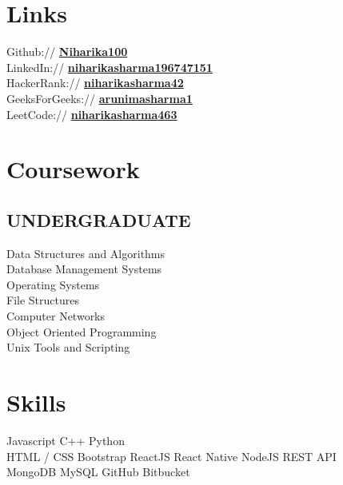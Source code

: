 \documentclass[]{deedy-resume-openfont}
\begin{document}
\begin{minipage}[t]{0.33\textwidth}

\section{Links} 
Github:// \href{https://github.com/Niharika100}{\bf Niharika100} \\
LinkedIn:// \href{https://www.linkedin.com/in/niharikasharma196747151/}{\bf niharikasharma196747151} \\
HackerRank:// \href{https://www.hackerrank.com/niharikasharma42}{\bf niharikasharma42} \\
GeeksForGeeks:// \href{https://auth.geeksforgeeks.org/user/arunimasharma1/profile}{\bf arunimasharma1} \\
LeetCode:// \href{https://leetcode.com/niharikasharma463/}{\bf niharikasharma463}


\sectionsep
\section{Coursework}
\subsection{UNDERGRADUATE}
Data Structures and Algorithms\\
Database Management Systems\\
Operating Systems\\
File Structures\\
Computer Networks\\
Object Oriented Programming\\
Unix Tools and Scripting\\
\sectionsep


\section{Skills}
\textbullet{} Javascript \textbullet{} C++ \textbullet{} Python \\
\textbullet{} HTML / CSS \textbullet{} Bootstrap \textbullet{} ReactJS \textbullet{} React Native \textbullet{} NodeJS \textbullet{} REST API \\
 \textbullet{} MongoDB \textbullet{} MySQL  \textbullet{} GitHub \textbullet{} Bitbucket
\sectionsep

%
%

\end{minipage} 
\end{document}
